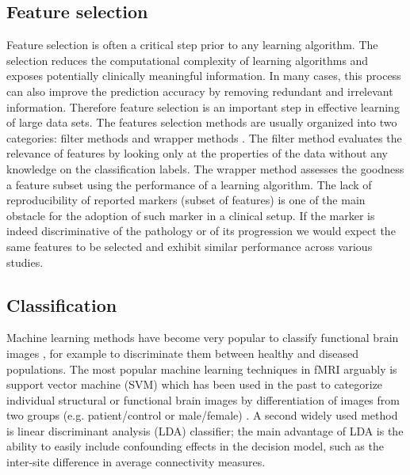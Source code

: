 \subsection{Feature selection}
Feature selection is often a critical step prior to any learning algorithm. The selection reduces the computational complexity of learning algorithms and exposes potentially clinically meaningful information. In many cases, this process can also improve the prediction accuracy by removing redundant and irrelevant information. Therefore feature selection is an important step in effective learning of large data sets. The features selection methods are usually organized into two categories: filter methods and wrapper methods \citep{Kotsiantis2007}. The filter method evaluates the relevance of features by looking only at the properties of the data without any knowledge on the classification labels. The wrapper method assesses the goodness a feature subset using the performance of a learning algorithm. The lack of reproducibility of reported markers (subset of features) is one of the main obstacle for the adoption of such marker in a clinical setup. If the marker is 
indeed discriminative of the pathology or of its progression we would expect the same features to be selected and exhibit similar performance across various studies. 


\subsection{Classification}
Machine learning methods have become very popular to classify functional brain images \citep{Costafreda2009,Fu2008,Hahn2011,Marquand2008,Nouretdinov2011}, for example to discriminate them between healthy and diseased populations. The most popular machine learning techniques in fMRI arguably is support vector machine (SVM) \citep{Cortes1995} which has been used in the past to categorize individual structural or functional brain images by differentiation of images from two groups (e.g. patient/control or male/female) \citep{Lao2004, Fan2005, Mourao-Miranda2005, Kawasaki2007}. 
A second widely used method is linear discriminant analysis (LDA) classifier; the main advantage of LDA is the ability to easily include confounding effects in the decision model, such as the inter-site difference in average connectivity measures.


